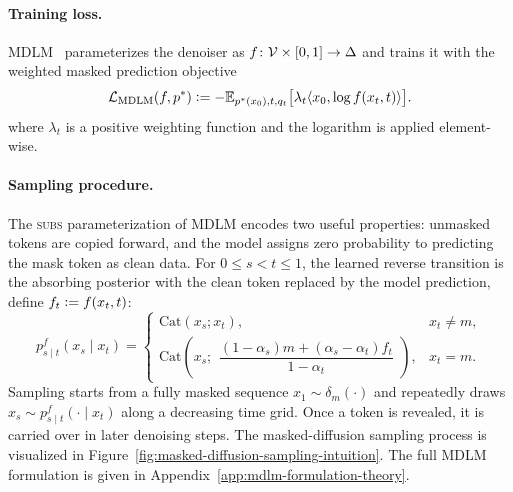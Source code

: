     \paragraph{Training loss.}
    MDLM~\citep{sahoo2024simple, shi2024simplified} parameterizes the denoiser as $f\colon \mathcal{V} \times [0,1]\to\Delta$ and trains it with the weighted masked prediction objective
    \begin{equation}
    \label{eq:mdlm loss}
    \begin{aligned}
    \mathcal{L}_{\text{MDLM}}(f, p^*)
    \vcentcolon= -
    \mathbb{E}_{p^*(x_0), t, q_t}
    \bigl[
        \lambda_{t} \langle  x_0, \log f(x_t, t) \rangle
    \bigr].
    \end{aligned}
    \end{equation}
    where $\lambda_t$ is a positive weighting function and the logarithm is applied element-wise.

    \paragraph{Sampling procedure.}
    The \textsc{subs} parameterization of MDLM encodes two useful properties: unmasked tokens are copied forward, and the model assigns zero probability to predicting the mask token as clean data. For $0\leq s<t\leq1$, the learned reverse transition is the absorbing posterior with the clean token replaced by the model prediction, define $f_t\vcentcolon=f(x_t,t)$:
    \begin{equation}        
    \!\!p^{f}_{s\mid t}(x_s\!\mid\! x_t)
    \!\!=\!\!
    \begin{cases}
    \mathrm{Cat}(x_s; x_t),\!\! & \!\!x_t\neq m,\\[2pt]
    \mathrm{Cat}\!\left(
    \!x_s;
    \!\!\begin{gathered}
    \dfrac{(1\!-\!\alpha_s) m \! +\! (\alpha_s\!-\!\alpha_t)f_t}{1-\alpha_t}
    \end{gathered}\!\!
    \right), \!\! & \!\!x_t=m .
    \end{cases} \nonumber
    \end{equation}
    Sampling starts from a fully masked sequence $x_1\sim\delta_m(\cdot)$ and repeatedly draws $x_s\sim p^{f}_{s\mid t}(\cdot\mid x_t)$ along a decreasing time grid. Once a token is revealed, it is carried over in later denoising steps. The masked-diffusion sampling process is visualized in Figure~\ref{fig:masked-diffusion-sampling-intuition}. The full MDLM formulation is given in Appendix~\ref{app:mdlm-formulation-theory}.

